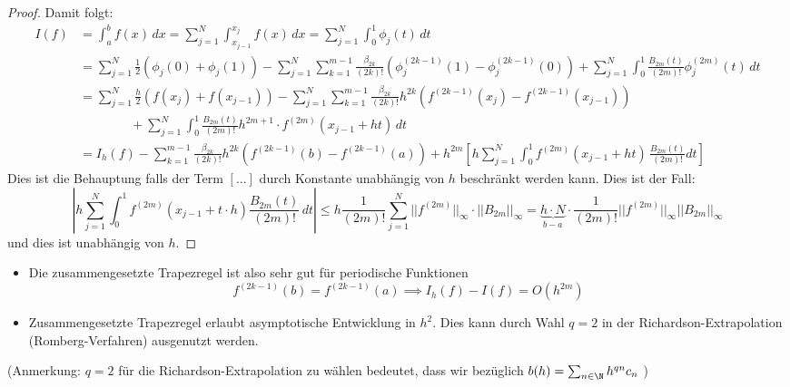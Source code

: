 \documentclass[11pt]{scrbook}
\begin{document}
\begin{st}
\begin{proof}
		Damit folgt:
		\begin{align*}
			I(f)&=\int_a^b f(x)\, dx = \sum_{j=1}^N \int_{x_{j-1}}^{x_j} f(x) \, dx = \sum_{j=1}^N \int_0^1 \phi_j(t)\, dt\\
			&= \sum_{j=1}^N \frac{1}{2}(\phi_j(0)+ \phi_j(1))- \sum_{j=1}^N \sum_{k=1}^{m-1} \frac{\beta_{2k}}{(2k)!} ( \phi_j^{(2k-1)} (1)-\phi_j^{(2k-1)}(0))+\sum_{j=1}^N \int_0^1 \frac{B_{2m}(t)}{(2m)!} \phi_j^{(2m)}(t)\, dt\\
			&= \sum_{j=1}^N \frac{h}{2} (f(x_j)+f(x_{j-1})) - \sum_{j=1}^N \sum_{k=1}^{m-1} \frac{\beta_{2k}}{(2k)!} h^{2k} (f^{(2k-1)}(x_j)-f^{(2k-1)} (x_{j-1})) \\
			&\qquad \qquad + \sum_{j=1}^N \int_0^1 \frac{B_{2m}(t)}{(2m)!} h^{2m+1} \cdot f^{(2m)}(x_{j-1}+ ht)\, dt\\
			&= I_h(f)- \sum_{k=1}^{m-1} \frac{\beta_{2k}}{(2k)!} h^{2k} (f^{(2k-1)} (b)-f^{(2k-1)}(a)) +h^{2m}\left [h \sum_{j=1}^N \int_0^1 f^{(2m)} (x_{j-1}+ht)\, \frac{B_{2m}(t)}{(2m)!} dt\right ]
		\end{align*}
		Dies ist die Behauptung falls der Term $[...]$ durch Konstante unabhängig von $h$ beschränkt werden kann. Dies ist der Fall:
		\[
			|h\sum_{j=1}^N \int_0^1 f^{(2m)}(x_{j-1}+t\cdot h) \frac{B_{2m}(t)}{(2m)!} \, dt|\le h \frac{1}{(2m)!} \sum_{j=1}^N ||f^{(2m)}||_\infty \cdot ||B_{2m}||_\infty = \underbrace{h\cdot N}_{b-a}\cdot \frac{1}{(2m)!} ||f^{(2m)}||_\infty ||B_{2m}||_\infty
		\]
		und dies ist unabhängig von $h$.
	\end{proof}
\end{st}
\begin{note*}
	\begin{itemize}
		\item Die zusammengesetzte Trapezregel ist also sehr gut für periodische Funktionen
			\[
				f^{(2k-1)}(b)=f^{(2k-1)}(a) \implies I_h(f)-I(f)=O(h^{2m})
			\]
		\item Zusammengesetzte Trapezregel erlaubt asymptotische Entwicklung in $h^2$. Dies kann durch Wahl $q=2$ in der Richardson-Extrapolation (Romberg-Verfahren) ausgenutzt werden.
	\end{itemize}
	(Anmerkung: $q=2$ für die Richardson-Extrapolation zu wählen bedeutet, dass wir bezüglich $b(h)=\sum_{n\in \N} h^{qn} c_n$ ) \\
\end{note*}
\end{document}
